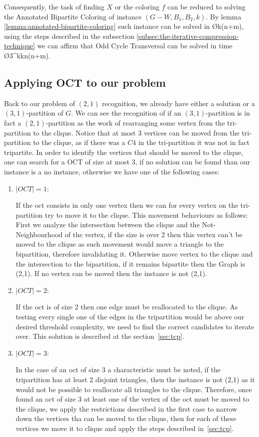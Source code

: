 Consequently, the task of finding $X$ or the coloring $f$ can be reduced to solving the Annotated Bipartite Coloring of instance $(G-W,B_1,B_2,k)$.
By lemma \ref{lemma:annotated-bipartite-coloring} such instance can be solved in \O{k(n+m)}, using the steps described in the subsection \ref{subsec:the-iterative-compression-technique}
we can affirm that Odd Cycle Transversal can be solved in time \O{3^kkn(n+m)}.

\subsection{Applying OCT to our problem}\label{subsec:applying-oct-to-our-problem}

Back to our problem of $(2,1)$ recognition, we already have either a solution or a $(3,1)$-partition of $G$.
We can see the recognition of if an $(3,1)$-partition is in fact a $(2,1)$-partition as the work of rearranging some vertex from the tri-partition to the clique.
Notice that at most 3 vertices can be moved from the tri-partition to the clique, as if there was a $C4$ in the tri-partition it was not in fact tripartite.
In order to identify the vertices that should be moved to the clique, one can search for a OCT of size at most 3, if no solution can be found than our instance is a no instance, otherwise we have one of the following cases:

\begin{enumerate}
  \item $|OCT|=1$:

      If the oct consists in only one vertex then we can for every vertex on the tri-partition try to move it to the clique.
      This movement behaviours as follows: First we analyze the intersection between the clique and the Not-Neighbourhood of the vertex,
      if the size is over 2 then this vertex can't be moved to the clique as such movement would move a triangle to the bipartition, therefore invalidating it.
      Otherwise move vertex to the clique and the intersection to the bipartition, if it remains bipartite then the Graph is (2,1). If no vertex can be moved then the instance is not (2,1).
  \item $|OCT|=2$:

      If the oct is of size 2 then one edge must be reallocated to the clique.
      As testing every single one of the edges in the tripartition would be above our desired threshold complexity, we need to find the correct candidates to iterate over.
      This solution is described at the section~\ref{sec:tcp}.
  \item $|OCT|=3$:

      In the case of an oct of size 3 a characteristic must be noted, if the tripartition has at least 2 disjoint triangles,
      then the instance is not (2,1) as it would not be possible to reallocate all triangles to the clique.
      Therefore, once found an oct of size 3 at least one of the vertex of the oct must be moved to the clique,
      we apply the restrictions described in the first case to narrow down the vertices tha can be moved to the clique,
      then for each of these vertices we move it to clique and apply the steps described in~\ref{sec:tcp}.
\end{enumerate}

